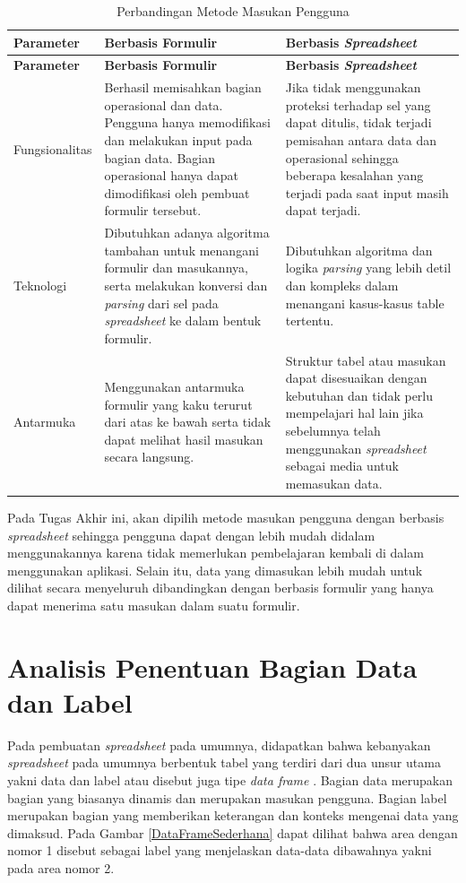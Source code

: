 	\begin{small}
	\begin{longtable}{ | p{3cm} | p{4cm} | p{4cm} | }
	    \caption{Perbandingan Metode Masukan Pengguna}
	    \label{ModelInteraksi}\\ \hline
	    \centering\bfseries{Parameter} & \centering\bfseries{Berbasis Formulir} & \centering\bfseries{Berbasis \textit{Spreadsheet}} \tabularnewline \hline
	    \endfirsthead
	    \hline
	    \centering\bfseries{Parameter} & \centering\bfseries{Berbasis Formulir} & \centering\bfseries{Berbasis \textit{Spreadsheet}} \tabularnewline \hline
	    \endhead
	    Fungsionalitas & Berhasil memisahkan bagian operasional dan data. Pengguna hanya memodifikasi dan melakukan input pada bagian data. Bagian operasional hanya dapat dimodifikasi oleh pembuat formulir tersebut. & Jika tidak menggunakan proteksi terhadap sel yang dapat ditulis, tidak terjadi pemisahan antara data dan operasional sehingga beberapa kesalahan yang terjadi pada saat input masih dapat terjadi. \\ \hline
	    Teknologi & Dibutuhkan adanya algoritma tambahan untuk menangani formulir dan masukannya, serta melakukan konversi dan \textit{parsing} dari sel pada \textit{spreadsheet} ke dalam bentuk formulir. & Dibutuhkan algoritma dan logika \textit{parsing} yang lebih detil dan kompleks dalam menangani kasus-kasus table tertentu. \\ \hline
	    Antarmuka & Menggunakan antarmuka formulir yang kaku terurut dari atas ke bawah serta tidak dapat melihat hasil masukan secara langsung. & Struktur tabel atau masukan dapat disesuaikan dengan kebutuhan dan tidak perlu mempelajari hal lain jika sebelumnya telah menggunakan \textit{spreadsheet} sebagai media untuk memasukan data. \\ \hline
  	\end{longtable}
	\end{small}

  	Pada Tugas Akhir ini, akan dipilih metode masukan pengguna dengan berbasis \textit{spreadsheet} sehingga pengguna dapat dengan lebih mudah didalam menggunakannya karena tidak memerlukan pembelajaran kembali di dalam menggunakan aplikasi. Selain itu, data yang dimasukan lebih mudah untuk dilihat secara menyeluruh dibandingkan dengan berbasis formulir yang hanya dapat menerima satu masukan dalam suatu formulir.

\section{Analisis Penentuan Bagian Data dan Label}
Pada pembuatan \textit{spreadsheet} pada umumnya, didapatkan bahwa kebanyakan \textit{spreadsheet} pada umumnya berbentuk tabel yang terdiri dari dua unsur utama yakni data dan label atau disebut juga tipe \textit{data frame} \citep{Chen2013}. Bagian data merupakan bagian yang biasanya dinamis dan merupakan masukan pengguna. Bagian label merupakan bagian yang memberikan keterangan dan konteks mengenai data yang dimaksud. Pada Gambar \ref{DataFrameSederhana} dapat dilihat bahwa area dengan nomor 1 disebut sebagai label yang menjelaskan data-data dibawahnya yakni pada area nomor 2.

